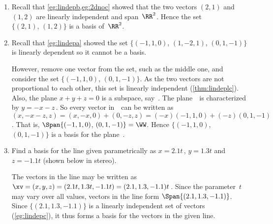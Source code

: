 \begin{example} 
\begin{enumerate}
\item Recall that \cref{eg:lindepb,eg:2dnoc} showed that the two vectors \((2,1)\) and \((1,2)\) are linearly independent and span~\(\RR^2\). 
Hence the set \(\{(2,1),\, (1,2)\}\) is a basis of~\(\RR^2\).

\item Recall that \cref{eg:lindepa} showed the set \(\{(-1,1,0)\), \((1,-2,1)\), \((0,1,-1)\}\) is linearly dependent so it cannot be a basis.

However, remove one vector from the set, such as the middle one, and consider the set \(\{(-1,1,0)\), \((0,1,-1)\}\).
As the two vectors are not proportional to each other, this set is linearly independent (\cref{thm:lindeplc}).
Also, the plane \(x+y+z=0\) is a subspace, say~\WW.
The plane~\WW\ is characterized by \(y=-x-z\)\,.
So every vector in~\WW\ can be written as \((x,-x-z,z)=(x,-x,0)+(0,-z,z)=(-x)(-1,1,0)+(-z)(0,1,-1)\). 
That is, \(\Span\{(-1,1,0)\), \((0,1,-1)\}=\WW\).
Hence \(\{(-1,1,0)\), \((0,1,-1)\}\) is a basis for the plane~\WW.

\item Find a basis for the line given parametrically as \(x=2.1t\)\,, \(y=1.3t\) and \(z=-1.1t\) (shown below in stereo).
\begin{center}
 {}
\end{center}
\begin{solution} 
The vectors in the line may be written as \(\xv=(x,y,z) =(2.1t,1.3t,-1.1t) =(2.1,1.3,-1.1)t\)\,.
Since the parameter~\(t\) may vary over all values, vectors in the line form \(\Span\{(2.1,1.3,-1.1)\}\). 
Since \(\{(2.1,1.3,-1.1)\}\) is a linearly independent set of vectors (\cref{eg:lindepc}), it thus forms a basis for the vectors in the given line.
\end{solution}



\end{enumerate}
\end{example}
